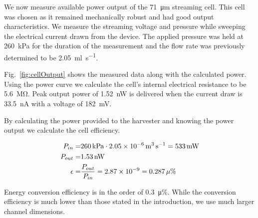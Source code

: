 \documentclass[10pt,final,journal]{IEEEtran}
\begin{document}
        We now measure available power output of the \SI{71}{\micro\metre} streaming cell.
        This cell was chosen as it remained mechanically robust and had good output characteristics.
        We measure the streaming voltage and pressure while sweeping the electrical current drawn from the device.
        The applied pressure was held at \SI{260}{\kilo\pascal} for the duration of the measurement and the flow rate was previously determined to be \SI{2.05}{\milli\litre\per\second}.

        Fig.~\ref{fig:cellOutput} shows the measured data along with the calculated power.
        Using the power curve we calculate the cell's internal electrical resistance to be \SI{5.6}{\mega\ohm}.
        Peak output power of \SI{1.52}{\nano\watt} is delivered when the current draw is \SI{33.5}{\nano\ampere} with a voltage of \SI{182}{\milli\volt}.

        By calculating the power provided to the harvester and knowing the power output we calculate the cell efficiency.



        \begin{eqnarray}
            P_{in} =& \SI{260}{kPa} \cdot \SI{2.05e-6}{\cubic\meter\per\second} = \SI{533}{mW}\\
            P_{out} =& \SI{1.53}{\nano\watt}\\
            \epsilon =& \frac{P_{out}}{P_{in}} = 2.87\times 10^{-9} = 0.287\thinspace\mu\%
        \end{eqnarray}


        Energy conversion efficiency is in the order of \SI{0.3}{\micro\percent}.
        While the conversion efficiency is much lower than those stated in the introduction, we use much larger channel dimensions.
\end{document}

